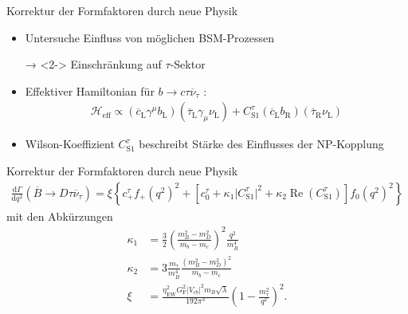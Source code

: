 \documentclass[fleqn, aspectratio=1610, professionalfonts, 9pt]{beamer}
\begin{document}
\begin{frame}{Korrektur der Formfaktoren durch neue Physik}
  \begin{itemize}
    \setlength\itemsep{1em}
    \item<1-> Untersuche Einfluss von möglichen BSM-Prozessen
    \item[→]<2-> Einschränkung auf $\tau$-Sektor
    \item<3-> Effektiver Hamiltonian für $b \to c \tau \overline{\nu}_\tau$ \cite{PhysRevD.88.094012}:
    \begin{align*}
        \mathcal{H}_\text{eff} \propto (\overline{c}_\text{L} \gamma^\mu b_\text{L})(\overline{\tau}_\text{L} \gamma_\mu \nu_\text{L} ) +  C_{\text{S}1}^\tau (\overline {c}_\text{L} b_\text{R}) (\overline{\tau}_\text{R} \nu_\text{L})
    \end{align*}
    \item<4-> Wilson-Koeffizient $C_{\text{S}1}^\tau$ beschreibt Stärke des Einflusses der NP-Kopplung
  \end{itemize}
\end{frame}


\begin{frame}{Korrektur der Formfaktoren durch neue Physik}
  \begin{align*}
      \frac{\mathrm{d} \Gamma}{\mathrm{d} q^2} \left(\overline{B} \to D \tau \overline{\nu}_{\tau} \right) = \xi \left\lbrace c_+^{\tau} f_+(q^2)^2 + \left\lbrack c_0^{\tau} + \kappa_1 \lvert C_{\text{S}1}^{\tau} \rvert^2 + \kappa_2 \operatorname{Re}(C_{\text{S}1}^{\tau}) \right\rbrack f_0(q^2)^2 \right\rbrace
  \end{align*}
  \vspace{5px}
  mit den Abkürzungen
  \begin{align*}
      \kappa_1 &= \frac{3}{2} \left( \frac{m_B^2 - m_D^2}{m_b - m_c} \right)^2 \frac{q^2}{m_B^4}\\
      \kappa_2 &= 3  \frac{m_\tau}{m_B^4} \frac{(m_B^2 - m_D^2)^2}{m_b - m_c} \\
      \xi &= \frac{\eta_\text{EW}^2 G_\text{F}^2 \lvert V_{cb} \rvert^2 m_B \sqrt{\lambda} }{192 \pi^3} \left( 1 - \frac{m_\tau^2}{q^2} \right)^2.
  \end{align*}
  \cite{PhysRevD.88.094012}
\end{frame}
\end{document}
